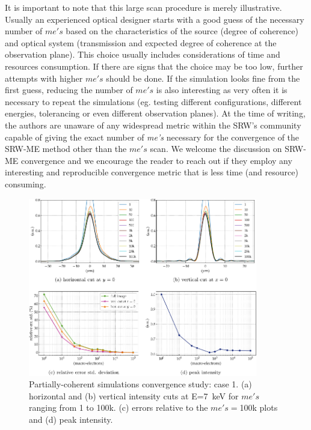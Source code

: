 \documentclass{iucr}              %
\begin{document}
It is important to note that this large scan procedure is merely illustrative. Usually an experienced optical designer starts with a good guess of the necessary number of $me's$ based on the characteristics of the source (degree of coherence) and optical system (transmission and expected degree of coherence at the observation plane). This choice usually includes considerations of time and resources consumption. If there are signs that the choice may be too low, further attempts with higher $me's$ should be done. If the simulation looks fine from the first guess, reducing the number of $me's$ is also interesting as very often it is necessary to repeat the simulations (eg. testing different configurations, different energies, tolerancing or even different observation planes). At the time of writing, the authors are unaware of any widespread metric within the SRW's community capable of giving the exact number of \textit{me's} necessary for the convergence of the SRW-ME method other than the $me's$ scan. We welcome the discussion on SRW-ME convergence and we encourage the reader to reach out if they employ any interesting and reproducible convergence metric that is less time (and resource) consuming.


\begin{figure}
    \centering
    \includegraphics[width=10cm]{figures/c1.pdf}
    \caption{Partially-coherent simulations convergence study: case 1. (a) horizontal and (b) vertical intensity cuts at E=7~keV for $me's$ ranging from 1 to 100k. (c) errors relative to the $me's=$100k plots and (d) peak intensity.}
    \label{fig:me_c1}
\end{figure}
\end{document}
